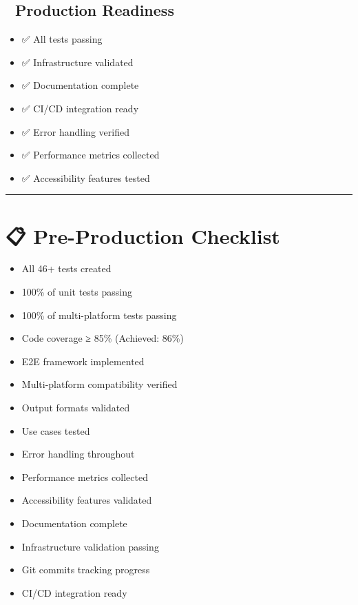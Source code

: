 \documentclass[
  11pt,
  oneside,
  openany]{scrbook}
\providecommand{\tightlist}{%
  \setlength{\itemsep}{0pt}\setlength{\parskip}{0pt}}\usepackage{longtable,booktabs,array}
\begin{document}
\subsection{🚀 Production Readiness}\label{production-readiness}

\begin{itemize}
\tightlist
\item
  ✅ All tests passing
\item
  ✅ Infrastructure validated
\item
  ✅ Documentation complete
\item
  ✅ CI/CD integration ready
\item
  ✅ Error handling verified
\item
  ✅ Performance metrics collected
\item
  ✅ Accessibility features tested
\end{itemize}

\begin{center}\rule{0.5\linewidth}{0.5pt}\end{center}

\section{📋 Pre-Production Checklist}\label{pre-production-checklist}

\begin{itemize}
\tightlist
\item[$\boxtimes$]
  All 46+ tests created
\item[$\boxtimes$]
  100\% of unit tests passing
\item[$\boxtimes$]
  100\% of multi-platform tests passing
\item[$\boxtimes$]
  Code coverage ≥ 85\% (Achieved: 86\%)
\item[$\boxtimes$]
  E2E framework implemented
\item[$\boxtimes$]
  Multi-platform compatibility verified
\item[$\boxtimes$]
  Output formats validated
\item[$\boxtimes$]
  Use cases tested
\item[$\boxtimes$]
  Error handling throughout
\item[$\boxtimes$]
  Performance metrics collected
\item[$\boxtimes$]
  Accessibility features validated
\item[$\boxtimes$]
  Documentation complete
\item[$\boxtimes$]
  Infrastructure validation passing
\item[$\boxtimes$]
  Git commits tracking progress
\item[$\boxtimes$]
  CI/CD integration ready
\end{itemize}
\end{document}
